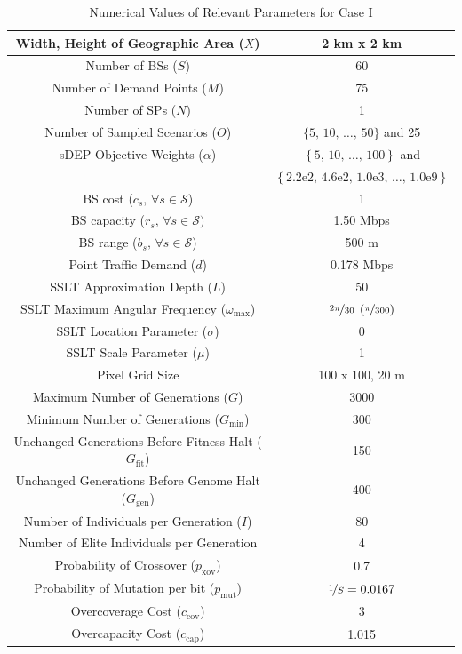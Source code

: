 \documentclass[12pt,dvipsnames]{report}
\newcommand{\expnumber}[2]{{#1}\mathrm{e}{#2}}
\begin{document}
\begin{table}[ht]
\centering
\caption{Numerical Values of Relevant Parameters for Case I}
\begin{tabular}{|c|c|} 
\hline
Width, Height of Geographic Area ($X$) & 2 km x 2 km \\
\hline
Number of BSs ($S$) & 60 \\ 
\hline 
Number of Demand Points ($M$) & 75 \\ 
\hline 
Number of SPs ($N$) & 1 \\
\hline
Number of Sampled Scenarios ($O$) & $\{5,\, 10,\, \ldots,\, 50\}$ and 25 \\ 
\hline 
sDEP Objective Weights ($\alpha$) & $\left\{ 5,\, 10,\, \ldots,\, 100 \right\}$ and \\
& $\left\{ \expnumber{2.2}{2},\, \expnumber{4.6}{2},\, \expnumber{1.0}{3},\, \ldots,\, \expnumber{1.0}{9} \right\}$ \\
\hline
BS cost ($c_s,\, \forall s \in \mathcal{S}$) & 1 \\ 
\hline 
BS capacity ($r_s,\, \forall s \in \mathcal{S})$ & 1.50 Mbps \\ 
\hline
BS range ($b_s,\, \forall s \in \mathcal{S}$) & 500 m \\
\hline 
Point Traffic Demand ($d$) & 0.178 Mbps \\ 
\hline 
\hline
SSLT Approximation Depth ($L$) & 50 \\ 
\hline
SSLT Maximum Angular Frequency ($\omega_{\max}$) & $\nicefrac{2 \pi}{30} \; \left( \nicefrac{\pi}{300} \right)$ \\
\hline 
SSLT Location Parameter ($\sigma$) & 0 \\ 
\hline 
SSLT Scale Parameter ($\mu$) & 1 \\ 
\hline
Pixel Grid Size & 100 x 100, 20 m \\
\hline 
\hline
Maximum Number of Generations ($G$) & 3000 \\ 
\hline
Minimum Number of Generations ($G_{\min}$) & 300 \\
\hline
Unchanged Generations Before Fitness Halt ($G_{\text{fit}}$) & 150 \\
\hline 
Unchanged Generations Before Genome Halt ($G_{\text{gen}}$) & 400 \\
\hline 
Number of Individuals per Generation ($I$) & 80 \\ 
\hline
Number of Elite Individuals per Generation & 4 \\
\hline 
Probability of Crossover ($p_\text{xov}$) & 0.7 \\ 
\hline
Probability of Mutation per bit ($p_\text{mut}$) & $\nicefrac{1}{S} = 0.0167$ \\
\hline 
Overcoverage Cost ($c_\text{cov}$) & 3 \\
\hline
Overcapacity Cost ($c_\text{cap}$) & 1.015 \\
\hline
\end{tabular}
\label{tab:CaseI_SimVal}
\end{table}
\end{document}
